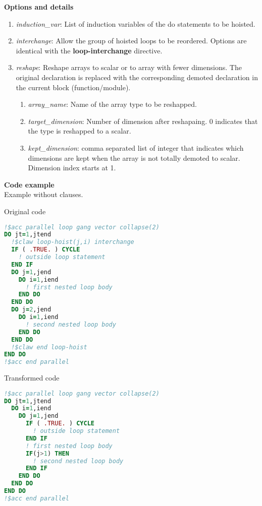 \textbf{Options and details}
\begin{enumerate}
\item \textit{induction\_var}: List of induction variables of the do statements to be hoisted.
\item \textit{interchange}: Allow the group of hoisted loops to be reordered.
Options are identical with the \textbf{loop-interchange} directive.
\item \textit{reshape}: Reshape arrays to scalar or to array with fewer
dimensions. The original declaration is replaced with the corresponding demoted
declaration in the current block (function/module).
\begin{enumerate}
  \item \textit{array\_name}: Name of the array type to be reshapped.
  \item \textit{target\_dimension}: Number of dimension after reshapaing. 0
  indicates that the type is reshapped to a scalar.
  \item \textit{kept\_dimension}: comma separated list of integer that indicates
  which dimensions are kept when the array is not totally demoted to scalar.
  Dimension index starts at 1.
\end{enumerate}
\end{enumerate}

\textbf{Code example}\\
\label{loop-hoist1}
Example without clauses.

Original code
\begin{lstlisting}[language=Fortran]
!$acc parallel loop gang vector collapse(2)
DO jt=1,jtend
  !$claw loop-hoist(j,i) interchange
  IF ( .TRUE. ) CYCLE
    ! outside loop statement
  END IF
  DO j=1,jend
    DO i=1,iend
      ! first nested loop body
    END DO
  END DO
  DO j=2,jend
    DO i=1,iend
      ! second nested loop body
    END DO
  END DO
  !$claw end loop-hoist
END DO
!$acc end parallel
\end{lstlisting}


Transformed code
\begin{lstlisting}[language=Fortran]
!$acc parallel loop gang vector collapse(2)
DO jt=1,jtend
  DO i=1,iend
    DO j=1,jend
      IF ( .TRUE. ) CYCLE
        ! outside loop statement
      END IF
      ! first nested loop body
      IF(j>1) THEN
        ! second nested loop body
      END IF
    END DO
  END DO
END DO
!$acc end parallel
\end{lstlisting}
